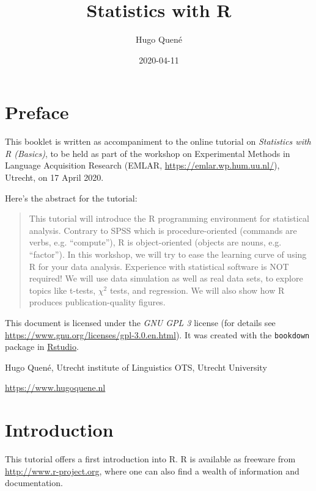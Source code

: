 \documentclass[]{book}
\title{Statistics with R}
\author{Hugo Quené}
\date{2020-04-11}
\begin{document}
\maketitle

{
\setcounter{tocdepth}{1}
\tableofcontents
}
\hypertarget{preface}{%
\chapter*{Preface}\label{preface}}

This booklet is written as accompaniment to the online tutorial on \emph{Statistics with R (Basics)}, to be held as part of the workshop on Experimental Methods in Language Acquisition Research (EMLAR, \url{https://emlar.wp.hum.uu.nl/}), Utrecht, on 17 April 2020.

Here's the abstract for the tutorial:

\begin{quote}
This tutorial will introduce the R programming environment for statistical analysis. Contrary to SPSS which is procedure-oriented (commands are verbs, e.g. ``compute''), R is object-oriented (objects are nouns, e.g. ``factor''). In this workshop, we will try to ease the learning curve of using R for your data analysis. Experience with statistical software is NOT required! We will use data simulation as well as real data sets, to explore topics like t-tests, \(\chi^2\) tests, and regression. We will also show how R produces publication-quality figures.
\end{quote}

This document is licensed under the \emph{GNU GPL 3} license (for details see
\url{https://www.gnu.org/licenses/gpl-3.0.en.html}). It was created with the \texttt{bookdown} package \citep{R-bookdown} in \href{https://www.rstudio.com}{Rstudio}.

Hugo Quené, Utrecht institute of Linguistics OTS, Utrecht University

\url{https://www.hugoquene.nl}

\hypertarget{ch:introduction}{%
\chapter{Introduction}\label{ch:introduction}}

This tutorial offers a first introduction into R.
R is available as freeware from
\url{http://www.r-project.org}, where one can also find a wealth of
information and documentation.
\end{document}
